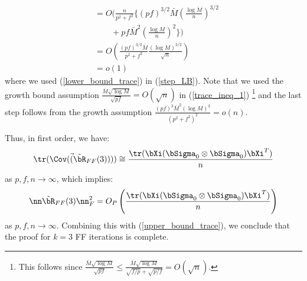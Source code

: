\begin{IEEEproof}
\begin{align}
		&= O\Big( \frac{n}{p^2+f^2} \Big\{(pf)^{3/2}\bar{M} (\frac{\log M}{n})^{3/2} \nonumber \\
		&\qquad + pf \bar{M}^2 (\frac{\log M}{n})^2 \Big\}  \Big) \label{step_LB} \\
		&= O\left( \frac{(pf)^{3/2} \bar{M}}{p^2+f^2} \frac{(\log M)^{3/2}}{\sqrt{n}} \right) \label{trace_ineq_1} \\
		&= o(1) \nonumber
\end{align}
where we used (\ref{lower_bound_trace}) in (\ref{step_LB}). Note that we used the growth bound assumption $\frac{\bar{M} \sqrt{\log M}}{\sqrt{pf}} =O(\sqrt{n})$ in (\ref{trace_ineq_1}) \footnote{This follows since $\frac{\bar{M} \sqrt{\log M}}{\sqrt{pf}} \leq \frac{\bar{M} \sqrt{\log M}}{\sqrt{f/p} + \sqrt{p/f}}=O(\sqrt{n})$.} and the last step follows from the growth assumption $\frac{(pf)^3 \bar{M}^2 (\log M)^3}{(p^2+f^2)^2}=o(n)$.

Thus, in first order, we have:
\begin{equation*}
	\tr(\Cov(\vec(\tilde{\bR}_{FF}(3)))) \cong \frac{ \tr(\bXi (\bSigma_0 \otimes \bSigma_0) \bXi^T)}{n}
\end{equation*}
as $p,f,n\to\infty$, which implies:
\begin{equation*}
	\nn \tilde{\bR}_{FF}(3) \nn_F^2 = O_P\left( \frac{\tr(\bXi (\bSigma_0 \otimes \bSigma_0) \bXi^T)}{n} \right)
\end{equation*}
as $p,f,n\to\infty$. Combining this with (\ref{upper_bound_trace}), we conclude that the proof for $k=3$ FF iterations is complete.








\end{IEEEproof}

